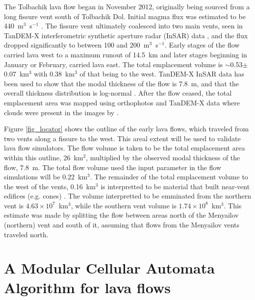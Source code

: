 The Tolbachik lava flow began in November 2012, originally being sourced from a long fissure vent south of Tolbachik Dol. Initial magma flux was estimated to be 440~m$^3$~s$^{-1}$ \citep{belousov2015overview}. The fissure vent ultimately coalesced into two main vents, seen in TanDEM-X interferometric synthetic aperture radar (InSAR) data \citep{kubanek2015lava}, and the flux dropped significantly to between 100 and 200~m$^3$~s$^{-1}$. Early stages of the flow carried lava west to a maximum runout of 14.5~km and later stages beginning in January or February, carried lava east. The total emplacement volume is $\sim$0.53$\pm$0.07~km$^3$ with 0.38~km$^3$ of that being to the west. TanDEM-X InSAR data has been used to show that the modal thickness of the flow is 7.8~m, and that the overall thickness distribution is log-normal \citep{kubanek2015lava}. After the flow ceased, the total emplacement area was mapped using orthophotos and TanDEM-X data where clouds were present in the images by \citet{kubanek2015lava}.

Figure \ref{fig_locator} shows the outline of the early lava flows, which traveled from two vents along a fissure to the west. This areal extent will be used to validate lava flow simulators. The flow volume is taken to be the total emplacement area within this outline, 26~km$^2$, multiplied by the observed modal thickness of the flow, 7.8~m. The total flow volume used the input parameter in the flow simulations will be 0.22~km$^3$. The remainder of the total emplacement volume to the west of the vents, 0.16~km$^3$ is interpretted to be material that built near-vent edifices (e.g. cones) \citep{kubanek2015lava}. The volume interpretted to be emminated from the northern vent is $4.63\times 10^7$~km$^3$, while the southern vent volume is $1.74\times 10^8$~km$^3$. This estimate was made by splitting the flow between areas north of the Menyailov (northern) vent and south of it, assuming that flows from the Menyailov vents traveled north.
	


\section{A Modular Cellular Automata Algorithm for lava flows}\label{sec:MOLASSES}


